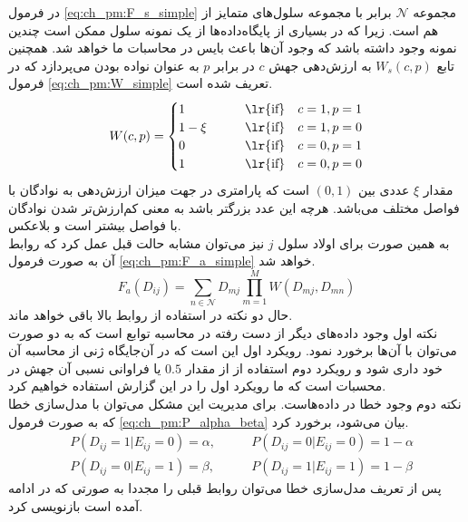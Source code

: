 در فرمول \ref{eq:ch_pm:F_s_simple} مجموعه $\mathcal{N}$ برابر با مجموعه سلول‌های متمایز از هم است. زیرا که در بسیاری از پایگاه‌داده‌ها از یک نمونه سلول ممکن است چندین نمونه وجود داشته باشد که وجود آن‌ها باعث بایس در محاسبات ما خواهد شد. همچنین تابع $W_s(c,p)$ به ارزش‌دهی جهش $c$ در برابر $p$ به عنوان نواده بودن می‌پردازد که در فرمول \ref{eq:ch_pm:W_simple} تعریف شده است.
\begin{equation}
	W(c, p) = 
	\begin{cases}
		1 	       &\qquad \text{\lr{if}} \quad c=1, p=1 \\
		1-\xi   &\qquad \text{\lr{if}} \quad c=1, p=0 \\
		0 		  &\qquad \text{\lr{if}} \quad c=0, p=1 \\
		1 	 	  &\qquad \text{\lr{if}} \quad c=0, p=0
	\end{cases}
	\label{eq:ch_pm:W_simple}
\end{equation}
مقدار $\xi$ عددی بین $(0,1)$ است که پارامتری در جهت میزان ارزش‌دهی به نوادگان با فواصل مختلف می‌باشد. هرچه این عدد بزرگتر باشد به معنی کم‌ارزش‌تر شدن نوادگان با فواصل بیشتر است و بلاعکس.
\\
به همین صورت برای اولاد سلول $j$ نیز می‌توان مشابه حالت قبل عمل کرد که روابط آن به صورت فرمول‌ \ref{eq:ch_pm:F_a_simple} خواهد شد.
\begin{equation}
	F_a(D_{ij}) = \sum_{n \in \mathcal{N}}  D_{mj}  \prod_{m=1}^{M} W(D_{mj}, D_{mn})
	\label{eq:ch_pm:F_a_simple}
\end{equation}
حال دو نکته در استفاده از روابط بالا باقی خواهد ماند. 
\\
نکته اول وجود داده‌های دیگر از دست رفته در محاسبه توابع است که به دو صورت می‌توان با آن‌ها برخورد  نمود. رویکرد اول این است که در آن‌جایگاه ژنی از محاسبه آن خود داری شود و رویکرد دوم استفاده از از مقدار $0.5$ یا فراوانی نسبی آن جهش در محسبات است که ما رویکرد اول را در این گزارش استفاده خواهیم کرد.
\\
نکته دوم وجود خطا در داده‌هاست. برای مدیریت این مشکل می‌توان با مدل‌سازی خطا که به صورت فرمول \ref{eq:ch_pm:P_alpha_beta} بیان می‌شود، برخورد کرد.
\begin{equation}
	\begin{aligned}
		&P(D_{ij}=1|E_{ij}=0)=\alpha, &\qquad P(D_{ij}=0|E_{ij}=0)=1-\alpha \\ &P(D_{ij}=0|E_{ij}=1)=\beta, &\qquad P(D_{ij}=1|E_{ij}=1)=1-\beta
	\end{aligned}
	\label{eq:ch_pm:P_alpha_beta}
\end{equation}
پس از تعریف مدل‌سازی خطا می‌توان روابط قبلی را مجددا به صورتی که در ادامه آمده است بازنویسی کرد.

